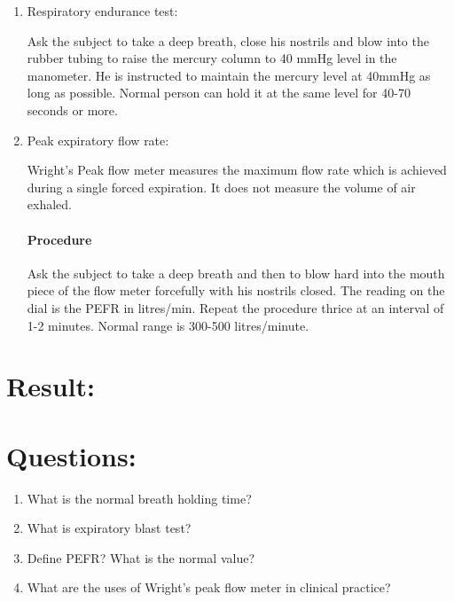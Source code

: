 \documentclass[a4paper,12pt,openany,twoside]{book}
\begin{document}
\begin{enumerate}
																\item{Respiratory endurance test: \par Ask the subject to take a deep breath, close his nostrils and blow into the rubber tubing to raise the mercury column to 40 mmHg level in the manometer. He is instructed to maintain the mercury level at 40mmHg as long as possible. Normal person can hold it at the same level for 40-70 seconds or more.}
																\item{Peak expiratory flow rate: \par Wright’s Peak flow meter measures the maximum flow rate which is achieved during a single forced expiration. It does not measure the volume of air exhaled.\newline
																	\paragraph{Procedure}
																	Ask the subject to take a deep breath and then to blow hard into the mouth piece of the flow meter forcefully with his nostrils closed. The reading on the dial is the PEFR in litres/min. Repeat the procedure thrice at an interval of 1-2 minutes. Normal range is 300-500 litres/minute.}
															\end{enumerate}
															\section*{Result:}
\vspace{1.5in}

\section*{Questions:}
\begin{enumerate}
\item{ What is the normal breath holding time?}
\item{ What is expiratory blast test?}
\item{ Define PEFR? What is the normal value?}
\item{ What are the uses of Wright’s peak flow meter in clinical practice?}
\end{enumerate}
\end{document}

